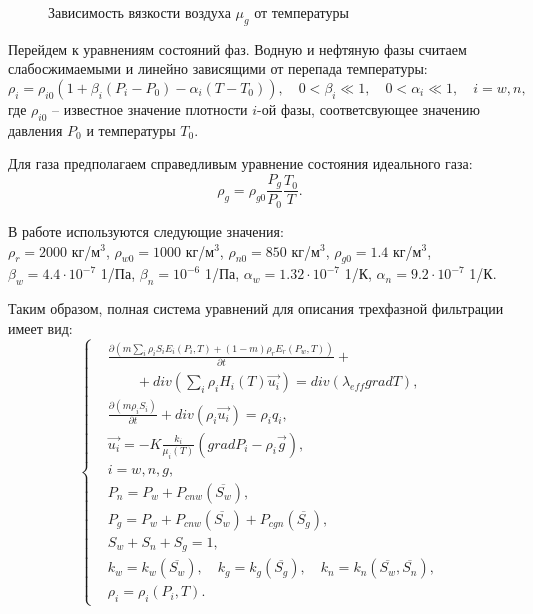 \begin{figure}[h]
\begin{center}
\caption{Зависимость вязкости воздуха $\mu_g$ от температуры}
\label{tikz_mu_g}
\end{center}
\end{figure}

Перейдем к уравнениям состояний фаз.
Водную и нефтяную фазы считаем слабосжимаемыми и линейно зависящими от перепада температуры:\\
$${\rho}_i = {\rho}_{i0} {(1 + {\beta}_i (P_i-P_0) - {\alpha}_i (T-T_0))},
{\quad}0<{\beta}_{i}{\ll}1,{\quad}0<{\alpha}_{i}{\ll}1,{\quad}i=w,n,$$
где ${\rho}_{i0}$ -- известное значение плотности $i$-ой фазы, соответсвующее
значению давления $P_0$ и температуры $T_0$.

Для газа предполагаем справедливым уравнение состояния идеального
газа:
$${\rho}_g = {\rho}_{g0}{\frac{P_g}{P_0}}{\frac{T_0}{T}}.$$

В работе используются следующие значения:\\
$\rho_r=2000$ кг/м$^3$, $\rho_{w0}=1000$ кг/м$^3$,
$\rho_{n0}=850$ кг/м$^3$, $\rho_{g0}=1.4$ кг/м$^3$,\\
$\beta_w=4.4\cdot10^{-7}$ 1/Па, $\beta_n=10^{-6}$ 1/Па,
$\alpha_w=1.32\cdot10^{-7}$ 1/К, $\alpha_n=9.2\cdot10^{-7}$ 1/К.

Таким образом, полная система уравнений для описания трехфазной фильтрации
имеет вид:
\begin{equation}
\left\{
  \begin{aligned}
    &\frac{\partial \left(m {\sum\limits_{i}{\rho_i S_i E_i(P_i, T)}} + (1-m){\rho_r E_r(P_w, T)}\right)}{\partial t} + \\
    & \qquad + div(\sum_{i}{\rho_i H_i(T) \overrightarrow{u_i}}) = div(\lambda_{eff} grad T), \\
    &\frac{\partial (m \rho_i S_i)}{\partial t}+ div(\rho_i \overrightarrow{u_i}) = \rho_i q_i, \\
    &\overrightarrow{u_i}=-K \frac{k_i}{{\mu_i(T)}}(grad P_i - {\rho}_i\overrightarrow{g}), \\
    &i=w,n,g, \\
    &P_n=P_w+P_{cnw}(\overline{S_w}), \\
    &P_g=P_w+P_{cnw}(\overline{S_w})+P_{cgn}(\overline{S_g}), \\
    &S_w + S_n + S_g=1, \\
    &k_w=k_w(\overline{S_w}),\quad k_g=k_g(\overline{S_g}),\quad k_n=k_n(\overline{S_w},\overline{S_n}), \\
    &\rho_i=\rho_i(P_i,T).
  \end{aligned}
\right.
\end{equation}

